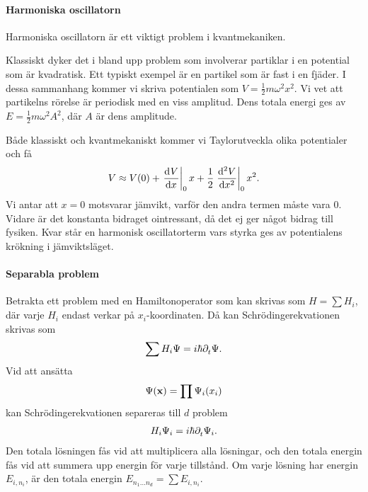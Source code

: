 \paragraph{Harmoniska oscillatorn}
Harmoniska oscillatorn är ett viktigt problem i kvantmekaniken.

Klassiskt dyker det i bland upp problem som involverar partiklar i en potential som är kvadratisk. Ett typiskt exempel är en partikel som är fast i en fjäder. I dessa sammanhang kommer vi skriva potentialen som $V = \frac{1}{2}m\omega^{2}x^{2}$. Vi vet att partikelns rörelse är periodisk med en viss amplitud. Dens totala energi ges av $E = \frac{1}{2}m\omega^{2}A^{2}$, där $A$ är dens amplitude.

Både klassiskt och kvantmekaniskt kommer vi Taylorutveckla olika potentialer och få
\begin{align*}
	V \approx V(0) + \deval{V}{x}{0}x + \frac{1}{2}\deval[2]{V}{x}{0}x^{2}.
\end{align*}
Vi antar att $x = 0$ motsvarar jämvikt, varför den andra termen måste vara $0$. Vidare är det konstanta bidraget ointressant, då det ej ger något bidrag till fysiken. Kvar står en harmonisk oscillatorterm vars styrka ges av potentialens krökning i jämviktsläget.

\paragraph{Separabla problem}
Betrakta ett problem med en Hamiltonoperator som kan skrivas som $H = \sum H_{i}$, där varje $H_{i}$ endast verkar på $x_{i}$-koordinaten. Då kan Schrödingerekvationen skrivas som
\begin{align*}
	\sum H_{i}\Psi = i\hbar\partial_{t}^{}\Psi.
\end{align*}
Vid att ansätta
\begin{align*}
	\Psi(\vb{x}) = \prod \Psi_{i}(x_{i})
\end{align*}
kan Schrödingerekvationen separeras till $d$ problem
\begin{align*}
	H_{i}\Psi_{i} = i\hbar\partial_{t}^{}\Psi_{i}.
\end{align*}
Den totala lösningen fås vid att multiplicera alla lösningar, och den totala energin fås vid att summera upp energin för varje tillstånd. Om varje lösning har energin $E_{i, n_{i}}$, är den totala energin $E_{n_{1}\dots n_{d}} = \sum E_{i, n_{i}}$.

